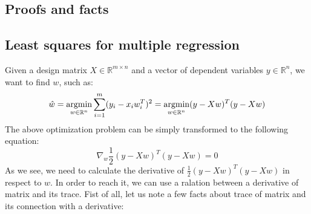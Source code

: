 \begin{appendices}

\chapter{Proofs and facts}

\section{Least squares for multiple regression}
\label{app:least}

Given a design matrix $X \in \mathbb{R}^{m \times n}$ and a vector of dependent variables $y \in \mathbb{R}^{n}$, we want to find $w$, such as:
\begin{equation}
    \hat{w} = \operatorname*{argmin}_{w \in \mathbb{R}^{n}}\sum\limits_{i=1}^{m}(y_i-x_iw^T_i)^2 = \operatorname*{argmin}_{w \in \mathbb{R}^{n}}(y-Xw)^T(y-Xw)
\end{equation}
The above optimization problem can be simply transformed to the following equation:
\begin{equation}\label{eq:least1}
    \nabla_w \frac{1}{2}(y-Xw)^T(y-Xw) = 0
\end{equation}
As we see, we need to calculate the derivative of $\frac{1}{2}(y-Xw)^T(y-Xw)$ in respect to $w$. In order to reach it, we can use a ralation between a derivative of matrix and its trace. Fist of all, let us note a few facts about trace of matrix and its connection with a derivative:


\end{appendices}
